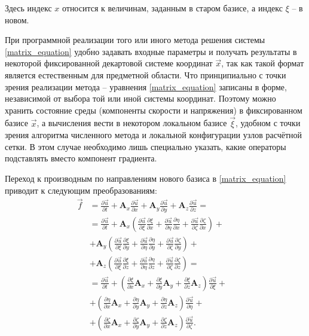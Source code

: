 Здесь индекс $x$ относится к величинам, заданным в старом базисе, а индекс $\xi$ -- в новом.

При программной реализации того или иного метода решения системы \eqref{matrix_equation} удобно задавать входные параметры и получать результаты в некоторой фиксированной декартовой системе координат $\vec x$, так как такой формат является естественным для предметной области. Что принципиально с точки зрения реализации метода -- уравнения \eqref{matrix_equation} записаны в форме, независимой от выбора той или иной системы координат. Поэтому можно хранить состояние среды (компоненты скорости и напряжения) в фиксированном базисе $\vec x$, а вычисления вести в некотором локальном базисе $\vec \xi$, удобном с точки зрения алгоритма численного метода и локальной конфигурации узлов расчётной сетки. В этом случае необходимо лишь специально указать, какие операторы подставлять вместо компонент градиента.

Переход к производным по направлениям нового базиса в \eqref{matrix_equation} приводит к следующим преобразованиям:
\begin{align}
\nonumber
\vec{f} &= \frac{\partial\vec{u}}{\partial{t}} + 
\mathbf{A}_x\frac{\partial\vec{u}}{\partial{x}} + 
\mathbf{A}_y\frac{\partial\vec{u}}{\partial{y}} + 
\mathbf{A}_z\frac{\partial\vec{u}}{\partial{z}} =
& \nonumber\\
&= \frac{\partial\vec{u}}{\partial{t}} + 
\mathbf{A}_x (\frac{\partial\vec{u}}{\partial{\xi}}\frac{\partial{\xi}}{\partial{x}} + 
\frac{\partial\vec{u}}{\partial{\eta}}\frac{\partial{\eta}}{\partial{x}} + 
\frac{\partial\vec{u}}{\partial{\zeta}}\frac{\partial{\zeta}}{\partial{x}} ) + 
& \nonumber\\
& + \mathbf{A}_y (\frac{\partial\vec{u}}{\partial{\xi}}\frac{\partial{\xi}}{\partial{y}} + 
\frac{\partial\vec{u}}{\partial{\eta}}\frac{\partial{\eta}}{\partial{y}} + 
\frac{\partial\vec{u}}{\partial{\zeta}}\frac{\partial{\zeta}}{\partial{y}} ) + 
& \nonumber\\
& + \mathbf{A}_z (\frac{\partial\vec{u}}{\partial{\xi}}\frac{\partial{\xi}}{\partial{z}} + 
\frac{\partial\vec{u}}{\partial{\eta}}\frac{\partial{\eta}}{\partial{z}} + 
\frac{\partial\vec{u}}{\partial{\zeta}}\frac{\partial{\zeta}}{\partial{z}} ) = 
& \nonumber\\
& = \frac{\partial\vec{u}}{\partial{t}} + 
( \frac{\partial{\xi}}{\partial{x}} \mathbf{A}_x  + 
\frac{\partial{\xi}}{\partial{y}} \mathbf{A}_y + 
\frac{\partial{\xi}}{\partial{z}} \mathbf{A}_z ) \frac{\partial\vec{u}}{\partial{\xi}} + 
& \nonumber\\
& + ( \frac{\partial{\eta}}{\partial{x}} \mathbf{A}_x + 
\frac{\partial{\eta}}{\partial{y}} \mathbf{A}_y + 
\frac{\partial{\eta}}{\partial{z}} \mathbf{A}_z ) \frac{\partial\vec{u}}{\partial{\eta}} + 
& \nonumber\\
& + ( \frac{\partial{\zeta}}{\partial{x}} \mathbf{A}_x  + 
\frac{\partial{\zeta}}{\partial{y}} \mathbf{A}_y + 
\frac{\partial{\zeta}}{\partial{z}} \mathbf{A}_z ) \frac{\partial\vec{u}}{\partial{\zeta}}.
\end{align}

